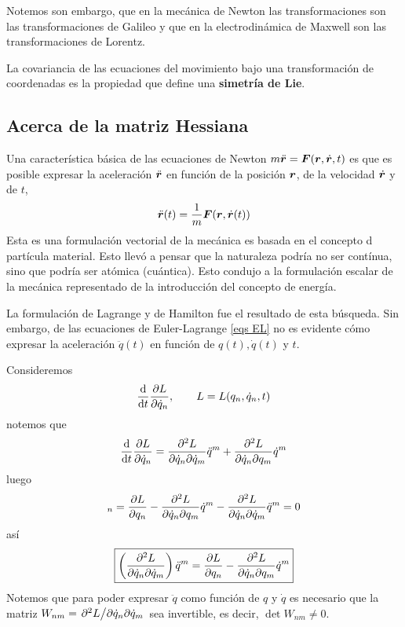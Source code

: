 Notemos son embargo, que en la mecánica de Newton las transformaciones son las transformaciones de Galileo y que en la electrodinámica de Maxwell son las transformaciones de Lorentz.

La covariancia de las ecuaciones del movimiento bajo una transformación de coordenadas es la propiedad que define una \textbf{simetría de Lie}.

\subsection{Acerca de la matriz Hessiana}
Una característica básica de las ecuaciones de Newton $m\ddot{\vb*{r}}=\vb*{F}(\vb*{r},\dot{\vb*{r}},t)$ es que es posible expresar la aceleración $\ddot{\vb*{r}}$ en función de la posición $\vb*{r}$, de la velocidad $\dot{\vb*{r}}$ y de $t$,
\begin{equation}
  \ddot{\vb*{r}}(t)=\frac{1}{m}\vb*{F}(\vb*{r},\dot{\vb*{r}}(t))
\end{equation}
Esta es una formulación vectorial de la mecánica  es basada en el concepto d partícula material. Esto llevó a pensar que la naturaleza podría no ser contínua, sino que podría ser atómica (cuántica). Esto condujo a la formulación escalar de la mecánica representado de la introducción del concepto de energía.

La formulación de Lagrange y de Hamilton fue el resultado de esta búsqueda. Sin embargo, de las ecuaciones de Euler-Lagrange \eqref{eqs EL} no es evidente cómo expresar la aceleración $\ddot{q}(t)$ en función de $q(t), \dot{q}(t)$ y $t$.

Consideremos
\begin{equation}
	\dv{t}\pdv{L}{\dot{q}_n},\qquad L=L(q_n,\dot{q}_n,t)
\end{equation}
notemos que
\begin{equation}
  \dv{t}\pdv{L}{\dot{q}_n}=\pdv{L}{\dot{q}_n}{\dot{q}_m}\ddot{q}^m+\pdv{L}{\dot{q}_n}{q_m}\dot{q}^m
\end{equation}
luego
\begin{equation}
  [L]_n=\pdv{L}{q_n}-\pdv{L}{\dot{q}_n}{q_m}\dot{q}^m-\pdv{L}{\dot{q}_n}{\dot{q}_m}\ddot{q}^m=0
\end{equation}
así
\begin{equation}
  \boxed{\left(\pdv{L}{\dot{q}_n}{\dot{q}_m}\right)\ddot{q}^m=\pdv{L}{q_n}-\pdv{L}{\dot{q}_n}{q_m}\dot{q}^m}
\end{equation}
Notemos que para poder expresar $\ddot{q}$ como función de $q$ y $\dot{q}$ es necesario que la matriz $W_{nm}=\pdv*{L}{\dot{q}_n}{\dot{q}_m}$ sea invertible, es decir, $\det W_{nm}\neq 0$.

